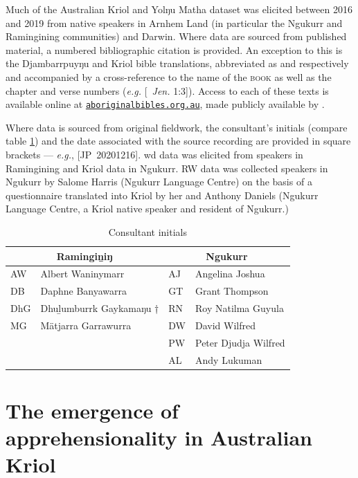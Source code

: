 \documentclass[11pt,dvipsnames]{report}
\begin{document}

Much of the Australian Kriol and Yolŋu Matha dataset was elicited between 2016 and 2019 from native speakers in Arnhem Land (in particular the Ngukurr and Ramingining communities) and Darwin. Where data are sourced from published material, a numbered bibliographic citation is provided. An exception to this is the Djambarrpuyŋu and Kriol bible translations, abbreviated as  and  respectively and accompanied by a cross-reference to the name of the \textsc{book} as well as the chapter and verse numbers (\textit{e.g.} [~\textit{Jen.} 1:3]). Access to each of these texts is available online at \href{https://aboriginalbibles.org.au/}{\tt aboriginalbibles.org.au}, made publicly available by \citeauthor{KB}.

  Where data is sourced from original fieldwork, the consultant's initials  (compare table \ref{tab:consultants}) and the date associated with the source recording are provided in square brackets --- \textit{e.g.}, [JP~20201216]. \acrlong{wd} data was elicited from speakers in Ramingining and Kriol data in Ngukurr. \acrlong{RW} data was collected speakers in Ngukurr by Salome Harris (Ngukurr Language Centre) on the basis of a questionnaire translated into Kriol by her and Anthony Daniels (Ngukurr Language Centre, a Kriol native speaker and resident of Ngukurr.) %
  
  
  
  \begin{table}\caption[List of consultants]{Consultant initials}\label{tab:consultants}
  	\centering	\begin{tabular}{ll|ll}
  		\multicolumn{2}{c}{\textbf{Ramingiṉiŋ}} &	\multicolumn{2}{c}{\textbf{Ngukurr}}\\\midrule
  		AW& Albert Waninymarr	& AJ & Angelina Joshua\\
  		DB & Daphne Banyawarra	& GT & Grant Thompson\\
  		DhG & Dhuḻumburrk Gaykamaŋu † & RN & Roy Natilma Guyula\\
  		MG & Mätjarra Garrawurra& DW & David Wilfred \\
  		&& PW & Peter Djudja Wilfred\\
  		&&AL & Andy Lukuman
  	\end{tabular}
  \end{table}

\part{The emergence of apprehensionality in Australian Kriol}\label{bambai}
 
\end{document}
